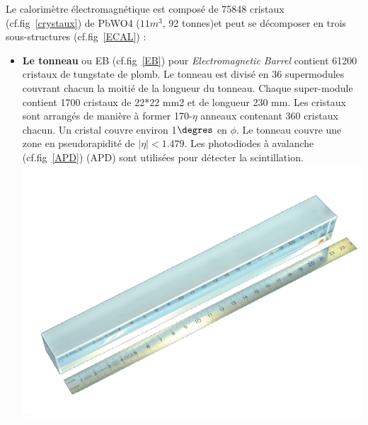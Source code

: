 Le calorimètre électromagnétique est composé de 75848 cristaux (cf.fig~\ref{crystaux}) de PbWO4 ($11 m^3$, 92 tonnes)et peut se décomposer en trois sous-structures (cf.fig~\ref{ECAL}) :
\begin{itemize}[label=$\bullet$]
	\item \textbf{Le tonneau} ou EB (cf.fig~\ref{EB}) pour \textit{Electromagnetic Barrel} contient 61200 cristaux de tungstate de plomb. Le tonneau est divisé en 36 supermodules couvrant chacun la moitié de la longueur du tonneau. Chaque super-module contient 1700 cristaux de 22*22 mm2 et de longueur 230 mm. Les cristaux sont arrangés de manière à former 170-$\eta$ anneaux contenant 360 cristaux chacun. Un cristal couvre environ 1$\degres$ en $\phi$. Le tonneau couvre une zone en pseudorapidité de $|\eta|<1.479$. Les photodiodes à avalanche (cf.fig~\ref{APD}) (APD) sont utilisées pour détecter la scintillation.
	\marginpar
	{
		\centering
		\includegraphics[width=\marginparwidth]{CMS/Crystaux.png}
		\label{crystaux}
	}
	

\end{itemize}
